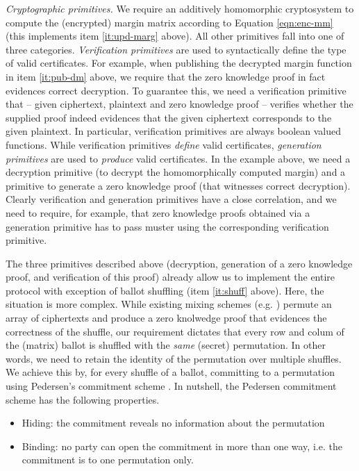 \documentclass{llncs}
\begin{document}
\smallskip\noindent\emph{Cryptographic primitives.}
We require an additively homomorphic cryptosystem to
compute the (encrypted) margin matrix according to Equation
\ref{eqn:enc-mm} (this implements item \ref{it:upd-marg} above). All
other primitives fall into one of three categories.
\emph{Verification primitives} are used to syntactically define
the type of valid certificates. For example, when publishing the
decrypted margin function in item \ref{it:pub-dm} above, we require
that the zero knowledge proof in fact evidences correct decryption.
To
guarantee this, we need a verification primitive that -- given
ciphertext, plaintext and zero knowledge proof -- verifies whether the supplied proof
indeed evidences that the given ciphertext corresponds to the given
plaintext. In particular, verification primitives are always boolean
valued functions. While verification primitives \emph{define} valid
certificates, \emph{generation primitives} are used to
\emph{produce} valid certificates. In the example above, we need a
decryption primitive (to decrypt the homomorphically computed
margin) and a primitive to generate a zero knowledge proof (that
witnesses correct decryption). Clearly verification and generation
primitives have a close correlation, and we need to require, for
example, that zero knowledge proofs obtained via a generation
primitive has to pass muster using the corresponding verification
primitive. 

The three primitives described above (decryption, generation of a
zero knowledge proof, and verification of this proof) already allow
us  to implement the entire protocol with exception of ballot
shuffling (item \ref{it:shuff} above).  Here, the situation is more
complex. While existing mixing schemes (e.g. \cite{Groth}) permute 
an array of ciphertexts and produce a zero knolwedge proof that
evidences the correctness of the shuffle, our requirement dictates
that every row and colum of the (matrix) ballot is
shuffled with the \emph{same} (secret) permutation.  In other words,
we need to retain the identity of the permutation over multiple
shuffles.  We achieve this by, for every shuffle of a ballot,
committing to a permutation using Pedersen's commitment scheme
\cite{Pederson}.
In nutshell, the Pedersen commitment scheme has the following properties. 
\begin{itemize}
\item Hiding: the commitment reveals no information about the
permutation
\item Binding: no party can open the commitment in more  
	 	than one way, i.e. the commitment is to one permutation only. 
\end{itemize}
\end{document}
